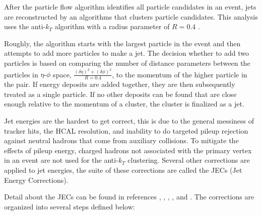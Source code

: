    After the particle flow algorithm identifies all particle candidates in an event, jets are reconstructed by an algorithms that clusters particle candidates. This analysis uses the anti-$k_T$ algorithm with a radius parameter of $R=0.4$\cite{anti_kt} \cite{jet_reco_algos}. 

    Roughly, the algorithm starts with the largest \pt particle in the event and then attempts to add more particles to make a jet. The decision whether to add two particles is based on comparing the number of distance parameters between the particles in $\eta$-$\phi$ space, $\frac{(\delta \eta)^2 + (\delta \phi)^2}{R=0.4}$, to the momentum of the higher \pt particle in the pair. If energy deposits are added together, they are then subsequently treated as a single particle. If no other deposits can be found that are close enough relative to the momentum of a cluster, the cluster is finalized as a jet.

    Jet energies are the hardest to get correct, this is due to the general messiness of tracker hits, the HCAL resolution, and inability to do targeted pileup rejection against neutral hadrons that come from auxiliary collisions. To mitigate the effects of pileup energy, charged hadrons not associated with the primary vertex in an event are not used for the anti-$k_T$ clustering. Several other corrections are applied to jet energies, the suite of these corrections are called the JECs (Jet Energy Corrections). 

    Detail about the JECs can be found in references \cite{JEC_2016}, \cite{jetmet_2011}, \cite{JERC}, \cite{jec_summary}, and \cite{intro_jec}. The corrections are organized into several steps defined below:

